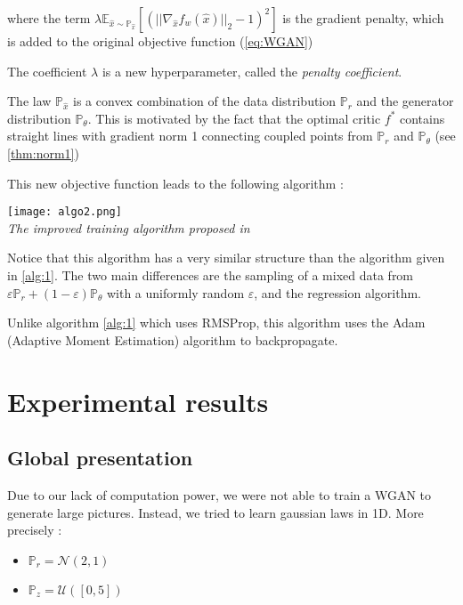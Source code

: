 \documentclass[a4paper]{report}
\newcommand{\Expec}{\mathbb{E}}
\newcommand{\Prob}{\mathbb{P}}
\theoremstyle{plain}
\theoremstyle{remark}
\theoremstyle{definition}
\begin{document}
where the term $\lambda
 \Expec_{\hat{x} \sim \Prob_{\hat{x}}} [ (||\nabla_{\hat{x}} f_w(\hat{x})||_2 -1)^2]$ is the gradient penalty, which is added to the original objective function (\ref{eq:WGAN})

The coefficient $\lambda$ is a new hyperparameter, called the \textit{penalty coefficient}.

The law $\Prob_{\hat{x}}$ is a convex combination of the data distribution $\Prob_r$ and the generator distribution $\Prob_\theta$. This is motivated by the fact that the optimal critic $f^*$ contains straight lines with gradient norm 1 connecting coupled points from $\Prob_r$ and $\Prob_\theta$ (see \ref{thm:norm1})

This new objective function leads to the following algorithm :

\begin{center}
	\label{alg:2}
	\texttt{[image: algo2.png]} \\
    \emph{The improved training algorithm proposed in \cite{gulrajani2017improved}}
\end{center}

Notice that this algorithm has a very similar structure than the algorithm given in \ref{alg:1}.
The two main differences are the sampling of a mixed data from $\varepsilon \Prob_r + (1-\varepsilon) \Prob_\theta$ with a uniformly random $\varepsilon$, and the regression algorithm.

Unlike algorithm \ref{alg:1} which uses RMSProp, this algorithm uses the Adam (Adaptive Moment Estimation) algorithm to backpropagate.

\chapter{Experimental results}
\label{chap:exp}

\section{Global presentation}

Due to our lack of computation power, we were not able to train a WGAN to generate large pictures. Instead, we tried to learn gaussian laws in 1D. More precisely :

\begin{itemize}
\item $\Prob_r = \mathcal{N}(2,1)$
\item $\Prob_z = \mathcal{U}([0,5])$
\end{itemize}
\end{document}
